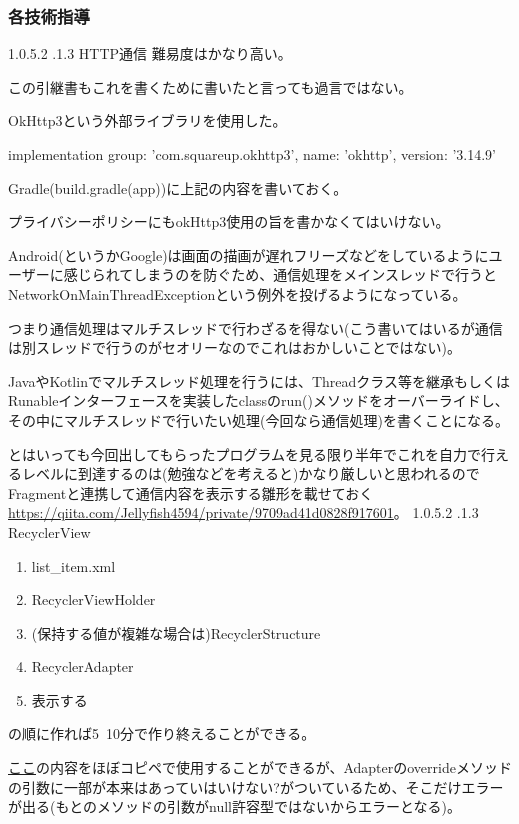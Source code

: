\documentclass[dvipdfmx,jb5]{jarticle}
\makeatletter
\newcommand{\subsubsubsection}{\@startsection{paragraph}{4}{\z@}%
    {1.0\Cvs \@plus.5\Cdp \@minus.2\Cdp}%
    {.1\Cvs \@plus.3\Cdp}%
    {\large \bfseries}
  }
\newcommand{\link}[2]{\href{#2}{#1}}
\makeatother
\begin{document}
\subsubsection{各技術指導}
 \subsubsubsection{HTTP通信}
 難易度はかなり高い。\par
 この引継書もこれを書くために書いたと言っても過言ではない。\par
 OkHttp3という外部ライブラリを使用した。\par
 implementation group: 'com.squareup.okhttp3', name: 'okhttp', version: '3.14.9'\par
 Gradle(build.gradle(app))に上記の内容を書いておく。\par
 プライバシーポリシーにもokHttp3使用の旨を書かなくてはいけない。\par
 Android(というかGoogle)は画面の描画が遅れフリーズなどをしているようにユーザーに感じられてしまうのを防ぐため、通信処理をメインスレッドで行うとNetworkOnMainThreadExceptionという例外を投げるようになっている。\par
 つまり通信処理はマルチスレッドで行わざるを得ない(こう書いてはいるが通信は別スレッドで行うのがセオリーなのでこれはおかしいことではない)。\par
 JavaやKotlinでマルチスレッド処理を行うには、Threadクラス等を継承もしくはRunableインターフェースを実装したclassのrun()メソッドをオーバーライドし、その中にマルチスレッドで行いたい処理(今回なら通信処理)を書くことになる。\par
 とはいっても今回出してもらったプログラムを見る限り半年でこれを自力で行えるレベルに到達するのは(勉強などを考えると)かなり厳しいと思われるのでFragmentと連携して通信内容を表示する雛形を載せておく{\ttfamily \url{https://qiita.com/Jellyfish4594/private/9709ad41d0828f917601}}。
 \subsubsubsection{RecyclerView}
 \begin{enumerate}
 \item list\_item.xml
 \item RecyclerViewHolder
 \item (保持する値が複雑な場合は)RecyclerStructure
 \item RecyclerAdapter
 \item 表示する
 \end{enumerate}
 の順に作れば5~10分で作り終えることができる。\par
 \link{ここ}{https://qiita.com/Todate/items/297bc3e4d0f3d2477ed3}の内容をほぼコピペで使用することができるが、Adapterのoverrideメソッドの引数に一部が本来はあっていはいけない?がついているため、そこだけエラーが出る(もとのメソッドの引数がnull許容型ではないからエラーとなる)。
\end{document}

